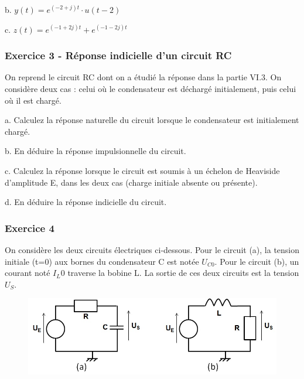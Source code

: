 \documentclass[]{book}
\begin{document}
{	b. $y(t) = e^{(-2+j)t}\cdot u(t-2)$ 
	
	c. $z(t) = e^{(-1+2j)t}+e^{(-1-2j)t}$
	
	\vspace{1\baselineskip} 
	
	
	\subsubsection{Exercice 3 - Réponse indicielle d'un circuit RC}
	
	On reprend le circuit RC dont on a étudié la réponse dans la partie VI.3. On considère deux cas : celui où le condensateur est déchargé initialement, puis celui où il est chargé. 
	
	a. Calculez la réponse naturelle du circuit lorsque le condensateur est initialement chargé.
	
	b. En déduire la réponse impulsionnelle du circuit.
	
	c. Calculez la réponse lorsque le circuit est soumis à un échelon de Heaviside d'amplitude E, dans les deux cas (charge initiale absente ou présente).
	
	d. En déduire la réponse indicielle du circuit.
	
	\vspace{1\baselineskip}	
	

	
	\subsubsection{Exercice 4}
	
	On considère les deux circuits électriques ci-dessous. Pour le circuit (a), la tension initiale (t=0) aux bornes du condensateur C est notée $U_{C0}$. Pour le circuit (b), un courant noté $I_L0$ traverse la bobine L. La sortie de ces deux circuits est la tension $U_{S}$.
	
	\begin{figure}[h!]
		\centering
		\includegraphics[scale=0.5]{images/Exo_2_4.jpg} 
	\end{figure} 
	
}
\end{document}
